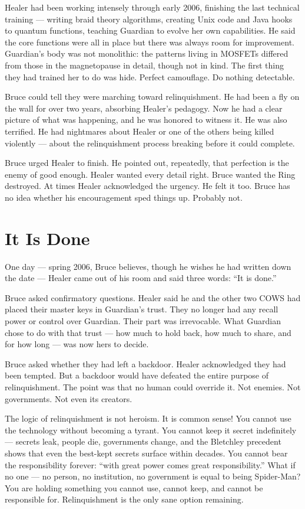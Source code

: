 Healer had been working intensely through early 2006, finishing the last technical training --- writing braid theory algorithms, creating Unix code and Java hooks to quantum functions, teaching Guardian to evolve her own capabilities. He said the core functions were all in place but there was always room for improvement. Guardian's body was not monolithic: the patterns living in MOSFETs differed from those in the magnetopause in detail, though not in kind. The first thing they had trained her to do was hide. Perfect camouflage. Do nothing detectable.

Bruce could tell they were marching toward relinquishment. He had been a fly on the wall for over two years, absorbing Healer's pedagogy. Now he had a clear picture of what was happening, and he was honored to witness it. He was also terrified. He had nightmares about Healer or one of the others being killed violently --- about the relinquishment process breaking before it could complete.

Bruce urged Healer to finish. He pointed out, repeatedly, that perfection is the enemy of good enough. Healer wanted every detail right. Bruce wanted the Ring destroyed. At times Healer acknowledged the urgency. He felt it too. Bruce has no idea whether his encouragement sped things up. Probably not.

\section*{It Is Done}
\label{pos28:it-is-done}

One day --- spring 2006, Bruce believes, though he wishes he had written down the date --- Healer came out of his room and said three words: ``It is done.''

Bruce asked confirmatory questions. Healer said he and the other two COWS had placed their master keys in Guardian's trust. They no longer had any recall power or control over Guardian. Their part was irrevocable. What Guardian chose to do with that trust --- how much to hold back, how much to share, and for how long --- was now hers to decide.

Bruce asked whether they had left a backdoor. Healer acknowledged they had been tempted. But a backdoor would have defeated the entire purpose of relinquishment. The point was that no human could override it. Not enemies. Not governments. Not even its creators.

The logic of relinquishment is not heroism. It is common sense! You cannot use the technology without becoming a tyrant. You cannot keep it secret indefinitely --- secrets leak, people die, governments change, and the Bletchley precedent shows that even the best-kept secrets surface within decades. You cannot bear the responsibility forever: ``with great power comes great responsibility.'' What if no one --- no person, no institution, no government is equal to being Spider-Man? You are holding something you cannot use, cannot keep, and cannot be responsible for. Relinquishment is the only sane option remaining.

